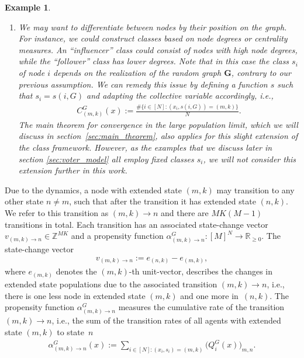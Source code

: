 \documentclass[a4paper,
               10pt,
               pdftex,
               normalheadings,
               headsepline,
               footsepline,
               headinclude,
               footinclude,
               DIV=14,
               abstracton]
{scrartcl}
\newtheorem{example}[theorem]{Example}
\newcommand{\R}{\mathbb{R}}
\newcommand{\rv}[1]{\bm{#1}}
\begin{document}
\begin{example}
\begin{enumerate}
    \item We may want to differentiate between nodes by their position on the graph. For instance, we could construct classes based on node degrees or centrality measures. An ``influencer'' class could consist of nodes with high node degrees, while the ``follower'' class has lower degrees. Note that in this case the class $s_i$ of node $i$ depends on the realization of the random graph $\rv{G}$, contrary to our previous assumption. We can remedy this issue by defining a function $s$ such that $s_i = s(i, G)$ and adapting the collective variable accordingly, i.e.,
    \begin{align}
        C^G_{(m, k)}(x) := \frac{\# \{i \in [N]: (x_i, s(i, G)) = (m, k) \}}{N}.
    \end{align}
    The main theorem for convergence in the large population limit, which we will discuss in section~\ref{sec:main_theorem}, also applies for this slight extension of the class framework. However, as the examples that we discuss later in section \ref{sec:voter_model} all employ fixed classes $s_i$, we will not consider this extension further in this work.
\end{enumerate}
\end{example}

Due to the dynamics, a node with extended state $(m,k)$ may transition to any other state $n \neq m$, such that after the transition it has extended state $(n,k)$.
We refer to this transition as $(m,k)\to n$ and there are $MK (M-1)$ transitions in total.
Each transition has an associated state-change vector $v_{(m,k)\to n} \in \mathbb{Z}^{MK}$ and a propensity function $\alpha^G_{(m,k)\to n}:[M]^N \to \R_{\geq 0}$.
The state-change vector
\begin{align}
    v_{(m,k)\to n} := e_{(n,k)} - e_{(m,k)},
\end{align}
where $e_{(m,k)}$ denotes the $(m,k)$-th unit-vector, describes the changes in extended state populations due to the associated transition $(m,k)\to n$, i.e., there is one less node in extended state $(m,k)$ and one more in~$(n, k)$.
The propensity function $\alpha^G_{(m,k)\to n}$ measures the cumulative rate of the transition $(m,k)\to n$, i.e., the sum of the transition rates of all agents with extended state $(m,k)$ to state~$n$
\begin{align}
    \alpha^G_{(m,k)\to n}(x) := \sum_{i \in [N]: (x_i,s_i) = (m,k)} \big(Q_i^{G}(x)\big)_{m, n}. \label{eq:propensity_functions}
\end{align}
\end{document}
